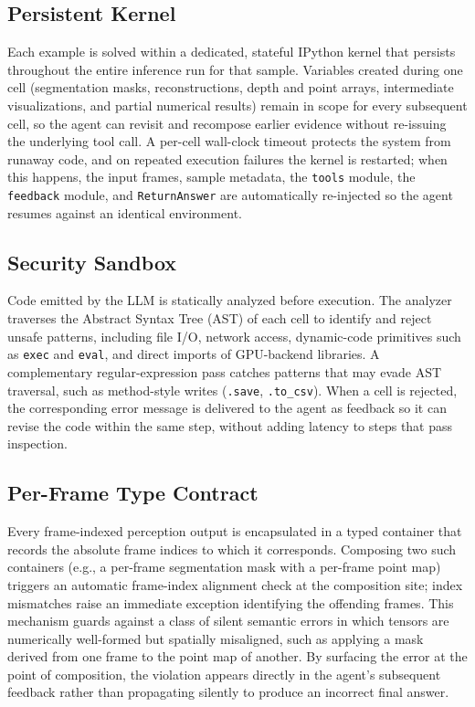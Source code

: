 \subsection{Persistent Kernel}
\label{app:kernel}
Each example is solved within a dedicated, stateful IPython kernel that persists throughout the entire inference run for that sample. Variables created during one cell (segmentation masks, reconstructions, depth and point arrays, intermediate visualizations, and partial numerical results) remain in scope for every subsequent cell, so the agent can revisit and recompose earlier evidence without re-issuing the underlying tool call. A per-cell wall-clock timeout protects the system from runaway code, and on repeated execution failures the kernel is restarted; when this happens, the input frames, sample metadata, the \texttt{tools} module, the \texttt{feedback} module, and \texttt{ReturnAnswer} are automatically re-injected so the agent resumes against an identical environment.

\subsection{Security Sandbox}
\label{app:sandbox}
Code emitted by the LLM is statically analyzed before execution. The analyzer traverses the Abstract Syntax Tree (AST) of each cell to identify and reject unsafe patterns, including file I/O, network access, dynamic-code primitives such as \texttt{exec} and \texttt{eval}, and direct imports of GPU-backend libraries. A complementary regular-expression pass catches patterns that may evade AST traversal, such as method-style writes (\texttt{.save}, \texttt{.to\_csv}). When a cell is rejected, the corresponding error message is delivered to the agent as feedback so it can revise the code within the same step, without adding latency to steps that pass inspection.

\subsection{Per-Frame Type Contract}
\label{app:per_frame}
Every frame-indexed perception output is encapsulated in a typed container that records the absolute frame indices to which it corresponds. Composing two such containers (e.g., a per-frame segmentation mask with a per-frame point map) triggers an automatic frame-index alignment check at the composition site; index mismatches raise an immediate exception identifying the offending frames. This mechanism guards against a class of silent semantic errors in which tensors are numerically well-formed but spatially misaligned, such as applying a mask derived from one frame to the point map of another. By surfacing the error at the point of composition, the violation appears directly in the agent's subsequent feedback rather than propagating silently to produce an incorrect final answer.

